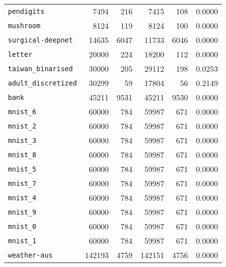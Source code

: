 \begin{tabular}{lrrrrr}
\texttt{pendigits}& 7494& 216& 7415& 108& 0.0000\\
\texttt{mushroom}& 8124& 119& 8124& 100& 0.0000\\
\texttt{surgical-deepnet}& 14635& 6047& 11733& 6046& 0.0000\\
\texttt{letter}& 20000& 224& 18200& 112& 0.0000\\
\texttt{taiwan\_binarised}& 30000& 205& 29112& 198& 0.0253\\
\texttt{adult\_discretized}& 30299& 59& 17804& 56& 0.2149\\
\texttt{bank}& 45211& 9531& 45211& 9530& 0.0000\\
\texttt{mnist\_6}& 60000& 784& 59987& 671& 0.0000\\
\texttt{mnist\_2}& 60000& 784& 59987& 671& 0.0000\\
\texttt{mnist\_3}& 60000& 784& 59987& 671& 0.0000\\
\texttt{mnist\_8}& 60000& 784& 59987& 671& 0.0000\\
\texttt{mnist\_5}& 60000& 784& 59987& 671& 0.0000\\
\texttt{mnist\_7}& 60000& 784& 59987& 671& 0.0000\\
\texttt{mnist\_4}& 60000& 784& 59987& 671& 0.0000\\
\texttt{mnist\_9}& 60000& 784& 59987& 671& 0.0000\\
\texttt{mnist\_0}& 60000& 784& 59987& 671& 0.0000\\
\texttt{mnist\_1}& 60000& 784& 59987& 671& 0.0000\\
\texttt{weather-aus}& 142193& 4759& 142151& 4756& 0.0000\\
\bottomrule
\end{tabular}
